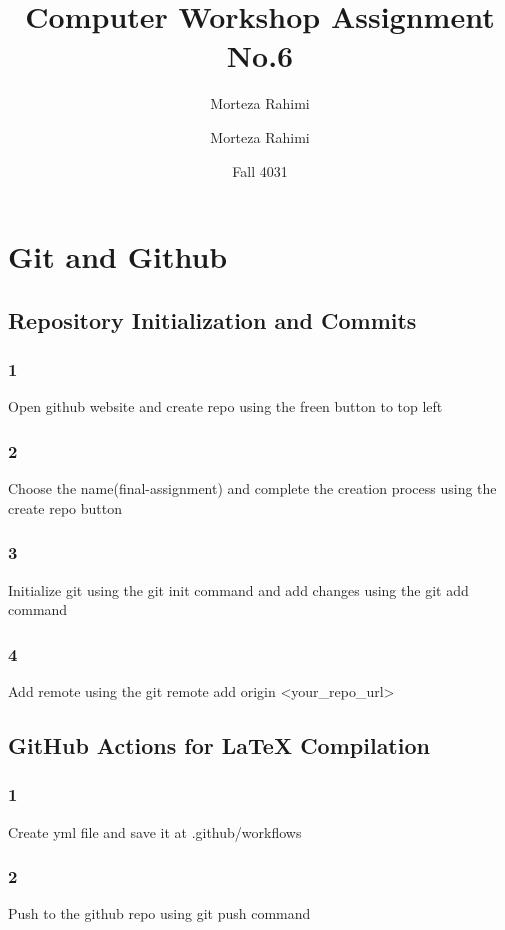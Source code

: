 \documentclass[30px]{article}
\title{{\tfont Computer Workshop Assignment No.6}}
\author{Morteza Rahimi}
\affil{Iran University of Science and Technology}
\date{Fall 4031}
\author{Morteza Rahimi}
\begin{document}
\maketitle
\newpage
\tableofcontents
\newpage
\section{Git and Github}
\subsection{Repository Initialization and Commits}
\subsubsection*{1} Open github website and create repo using the freen button to top left
\subsubsection*{2} Choose the name(final-assignment) and complete the creation process using the create repo button
\subsubsection*{3} Initialize git using the git init command and add changes using the git add command
\subsubsection*{4} Add remote using the git remote add origin <your_repo_url>
\subsection{GitHub Actions for LaTeX Compilation}
\subsubsection*{1} Create yml file and save it at .github/workflows
\subsubsection*{2} Push to the github repo using git push command
\end{document}
